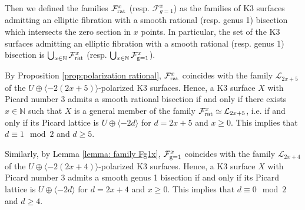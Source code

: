 \documentclass{amsart}
\theoremstyle{definition}
\numberwithin{equation}{section}
\begin{document}
Then we defined the families $\mathcal{F}_{\rm{rat}}^x$ (resp. $\mathcal{F}_{g=1}^x$) as the families of K3 surfaces admitting an elliptic fibration with a smooth rational (resp. genus 1) bisection which intersects the zero section in $x$ points. In particular, the set of the K3 surfaces admitting an elliptic fibration with a smooth rational (resp. genus 1) bisection is $\bigcup_{x\in\mathbb{N}}\mathcal{F}_{\rm{rat}}^x$ (resp. $\bigcup_{x\in\mathbb{N}}\mathcal{F}_{\rm{g=1}}^x$). 

By Proposition \ref{prop:polarization rational}, $\mathcal{F}_{\rm{rat}}^x$ coincides with the family $\mathcal{L}_{2x+5}$ of the $U\oplus \langle -2(2x+5)\rangle$-polarized K3 surfaces. Hence, a K3 surface $X$ with Picard number 3 admits a smooth rational bisection if and only if there exists $x\in\mathbb{N}$ such that $X$ is a general  member of the family $\mathcal{F}_{\rm{rat}}^x\simeq \mathcal{L}_{2x+5}$, i.e. if and only if its Picard lattice is $U\oplus \langle -2d\rangle$ for $d=2x+5$ and $x\geq 0$. This implies that $d\equiv 1\mod 2$ and $d\geq 5$.

Similarly, by Lemma \ref{lemma: family Fg1x}, $\mathcal{F}_{\rm{g=1}}^x$ coincides with the family $\mathcal{L}_{2x+4}$ of the $U\oplus \langle -2(2x+4)\rangle$-polarized K3 surfaces. Hence, a K3 surface $X$ with Picard number 3 admits a smooth genus 1 bisection if and only if its Picard lattice is $U\oplus \langle -2d\rangle$ for $d=2x+4$ and $x\geq 0$. This implies that $d\equiv 0\mod 2$ and $d\geq 4$.
\end{document}
